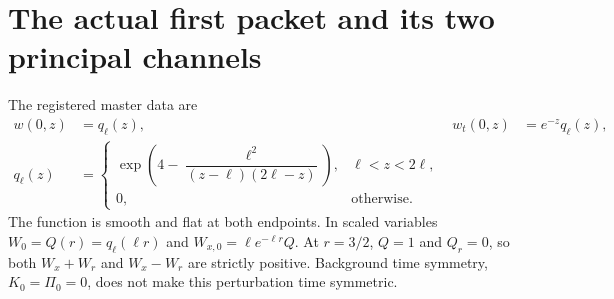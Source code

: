 \documentclass[11pt]{article}
\begin{document}
\section{The actual first packet and its two principal channels}
\label{sec:packet}
The registered master data are
\begin{equation}
\begin{aligned}
 w(0,z)&=q_\ell(z),& w_t(0,z)&=e^{-z}q_\ell(z),\\
 q_\ell(z)&=
 \begin{cases}
 \exp\!\left(4-\dfrac{\ell^2}{(z-\ell)(2\ell-z)}\right),&
                  \ell<z<2\ell,\\
 0,&\text{otherwise}.
 \end{cases}
\end{aligned}
\label{eq:packet}
\end{equation}
The function is smooth and flat at both endpoints. In scaled variables
$W_0=Q(r)=q_\ell(\ell r)$ and $W_{x,0}=\ell e^{-\ell r}Q$.
At $r=3/2$, $Q=1$ and $Q_r=0$, so both
$W_x+W_r$ and $W_x-W_r$ are strictly positive. Background time symmetry,
$K_0=\Pi_0=0$, does not make this perturbation time symmetric.
\end{document}
